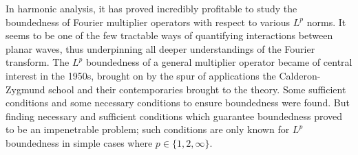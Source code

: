 \documentclass[11pt]{article}
\DeclareMathOperator{\RR}{\mathbb{R}}
\begin{document}
In harmonic analysis, it has proved incredibly profitable to study the boundedness of Fourier multiplier operators with respect to various $L^p$ norms. It seems to be one of the few tractable ways of quantifying interactions between planar waves, thus underpinning all deeper understandings of the Fourier transform. The $L^p$ boundedness of a general multiplier operator became of central interest in the 1950s, brought on by the spur of applications the Calderon-Zygmund school and their contemporaries brought to the theory. Some sufficient conditions and some necessary conditions to ensure boundedness were found. But finding necessary and sufficient conditions which guarantee boundedness proved to be an impenetrable problem; %
such conditions are only known for $L^p$ boundedness in simple cases where $p \in \{ 1, 2, \infty \}$.
%
%
%
%
%
%
%
%
%
% 
%
%
%
%
\end{document}
